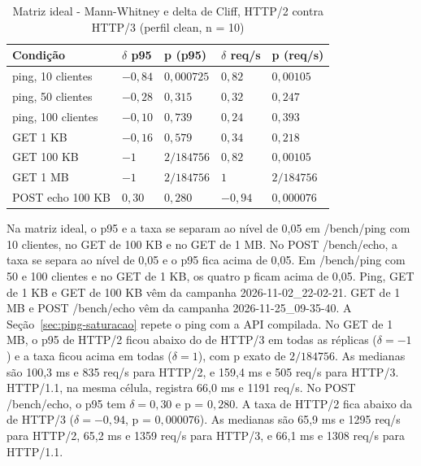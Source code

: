 \begin{table}[H]
\centering
\caption{Matriz ideal - Mann-Whitney e delta de Cliff, HTTP/2 contra HTTP/3 (perfil clean, n = 10)}\label{tab:mann-whitney-ideal}
\footnotesize
\setlength{\tabcolsep}{3pt}
\begin{tabular}{@{}>{\raggedright\arraybackslash}p{36mm}>{\centering\arraybackslash}p{18mm}>{\centering\arraybackslash}p{28mm}>{\centering\arraybackslash}p{20mm}>{\centering\arraybackslash}p{28mm}@{}} \hline
\textbf{Condição} & \textbf{$\delta$ p95} & \textbf{p (p95)} & \textbf{$\delta$ req/s} & \textbf{p (req/s)} \\
\hline
ping, 10 clientes & $-0{,}84$ & $0{,}000725$ & $0{,}82$ & $0{,}00105$ \\
ping, 50 clientes & $-0{,}28$ & $0{,}315$ & $0{,}32$ & $0{,}247$ \\
ping, 100 clientes & $-0{,}10$ & $0{,}739$ & $0{,}24$ & $0{,}393$ \\
GET 1 KB & $-0{,}16$ & $0{,}579$ & $0{,}34$ & $0{,}218$ \\
GET 100 KB & $-1$ & $2/184756$ & $0{,}82$ & $0{,}00105$ \\
GET 1 MB & $-1$ & $2/184756$ & $1$ & $2/184756$ \\
POST echo 100 KB & $0{,}30$ & $0{,}280$ & $-0{,}94$ & $0{,}000076$ \\
\hline
\end{tabular}
\end{table}

Na matriz ideal, o p95 e a taxa se separam ao nível de 0,05 em /bench/ping com 10 clientes, no GET de 100 KB e no GET de 1 MB. No POST /bench/echo, a taxa se separa ao nível de 0,05 e o p95 fica acima de 0,05. Em /bench/ping com 50 e 100 clientes e no GET de 1 KB, os quatro p ficam acima de 0,05. Ping, GET de 1 KB e GET de 100 KB vêm da campanha 2026-11-02\_22-02-21. GET de 1 MB e POST /bench/echo vêm da campanha 2026-11-25\_09-35-40. A Seção~\ref{sec:ping-saturacao} repete o ping com a API compilada. No GET de 1 MB, o p95 de HTTP/2 ficou abaixo do de HTTP/3 em todas as réplicas ($\delta = -1$) e a taxa ficou acima em todas ($\delta = 1$), com p exato de $2/184756$. As medianas são 100,3 ms e 835 req/s para HTTP/2, e 159,4 ms e 505 req/s para HTTP/3. HTTP/1.1, na mesma célula, registra 66,0 ms e 1191 req/s. No POST /bench/echo, o p95 tem $\delta = 0{,}30$ e p = $0{,}280$. A taxa de HTTP/2 fica abaixo da de HTTP/3 ($\delta = -0{,}94$, p = $0{,}000076$). As medianas são 65,9 ms e 1295 req/s para HTTP/2, 65,2 ms e 1359 req/s para HTTP/3, e 66,1 ms e 1308 req/s para HTTP/1.1.

